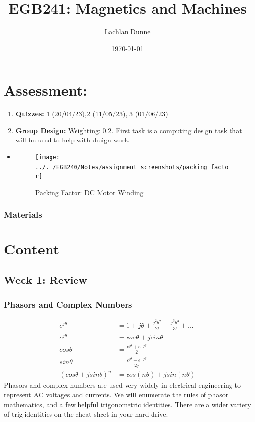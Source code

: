 \documentclass{book}
\title{EGB241: Magnetics and Machines}
\author{Lachlan Dunne}
\date{\today}
\begin{document}
\chapter{Assessment:}

\begin{enumerate}
	\item \textbf{Quizzes:} 1 (20/04/23),2 (11/05/23), 3 (01/06/23)
	\item \textbf{Group Design:} Weighting: 0.2. First task is a computing design task that will be used to help with design work.
\end{enumerate}

 

\begin{itemize}

	\item \begin{figure}
			\centering
			\texttt{[image: ../../EGB240/Notes/assignment\_screenshots/packing\_factor]}
			\caption{Packing Factor: DC Motor Winding}
			\label{fig:packingfactor}
		\end{figure}
\end{itemize}
\subsection{Materials}



\chapter{Content}

\section{Week 1: Review}

\subsection{Phasors and Complex Numbers}

\begin{align*}
	e^{j\theta} &= 1+ j \theta + \frac{j^2\theta^2}{2!} + \frac{j^3 \theta^3}{3!}+... \\
	e^{j \theta} &= cos \theta + j sin \theta \\
	cos\theta &= \frac{e^{j\theta} + e^{-j\theta}}{2} \\
	sin\theta &= \frac{e^{j\theta} - e^{-j\theta}}{2j} \\
	(cos\theta + jsin\theta)^n &= cos(n\theta)  + jsin (n\theta)
\end{align*}
Phasors and complex numbers are used very widely in electrical engineering to represent AC voltages and currents. We will enumerate the rules of phasor mathematics, and a few helpful trigonometric identities. There are a wider variety of trig identities on the cheat sheet in your hard drive.
\end{document}
